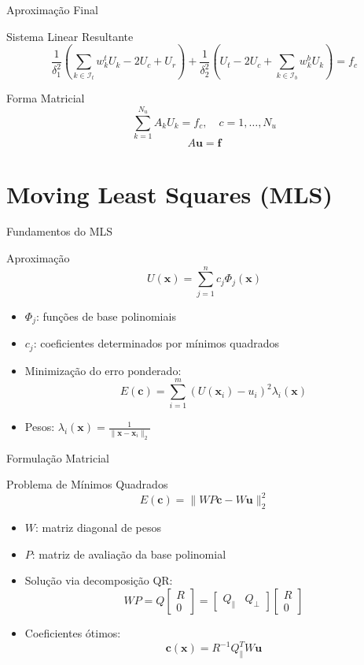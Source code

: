 \documentclass[../main/main.tex]{subfiles}
\begin{document}
\begin{frame}{Aproximação Final}
\begin{block}{Sistema Linear Resultante}
\[
\frac{1}{\delta_1^2}\left(\sum_{k \in \mathcal{I}_t} w_k^t U_k - 2U_c + U_r\right) + \frac{1}{\delta_2^2}\left(U_t - 2U_c + \sum_{k \in \mathcal{I}_b} w_k^b U_k\right) = f_c
\]
\end{block}

\begin{block}{Forma Matricial}
\[
\sum_{k=1}^{N_u} A_k U_k = f_c, \quad c = 1, \ldots, N_u
\]
\[
A\mathbf{u} = \mathbf{f}
\]
\end{block}
\end{frame}

\section{Moving Least Squares (MLS)}

\begin{frame}{Fundamentos do MLS}
\begin{block}{Aproximação}
\[
U(\mathbf{x}) = \sum_{j=1}^n c_j \Phi_j(\mathbf{x})
\]
\end{block}

\begin{itemize}
\item $\Phi_j$: funções de base polinomiais
\item $c_j$: coeficientes determinados por mínimos quadrados
\item Minimização do erro ponderado:
\[
E(\mathbf{c}) = \sum_{i=1}^m \left(U(\mathbf{x}_i) - u_i\right)^2 \lambda_i(\mathbf{x})
\]
\item Pesos: $\lambda_i(\mathbf{x}) = \frac{1}{\|\mathbf{x} - \mathbf{x}_i\|_2}$
\end{itemize}
\end{frame}

\begin{frame}{Formulação Matricial}
\begin{block}{Problema de Mínimos Quadrados}
\[
E(\mathbf{c}) = \|W P \mathbf{c} - W \mathbf{u}\|_2^2
\]
\end{block}

\begin{itemize}
\item $W$: matriz diagonal de pesos
\item $P$: matriz de avaliação da base polinomial
\item Solução via decomposição QR:
\[
WP = Q \begin{bmatrix} R \\ 0 \end{bmatrix} = \begin{bmatrix} Q_\parallel & Q_\perp \end{bmatrix} \begin{bmatrix} R \\ 0 \end{bmatrix}
\]
\item Coeficientes ótimos:
\[
\mathbf{c}(\mathbf{x}) = R^{-1} Q_\parallel^T W \mathbf{u}
\]
\end{itemize}
\end{frame}
\end{document}
